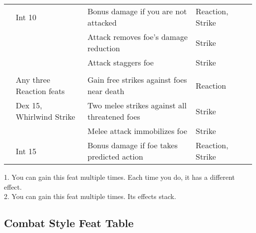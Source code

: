 \begin{longtabuwrapper}
\begin{longtabu}{>{\lcol}p{10em} >{\lcol}p{15em} >{\lcol}X >{\lcol}p{8em} >{\lcol}p{3em}}
         & Int 10 & Bonus damage if you are not attacked & Reaction, Strike &  \\
         & \x & Attack removes foe's damage reduction & Strike &  \\
         & \x & Attack staggers foe & Strike &  \\

        \midrule
         &  &  &  &  \\
         & Any three Reaction feats & Gain free strikes against foes near death & Reaction &  \\
         & Dex 15, Whirlwind Strike & Two melee strikes against all threatened foes & Strike &  \\
         & \x & Melee attack immobilizes foe & Strike &  \\
         & Int 15 & Bonus damage if foe takes predicted action & Reaction, Strike &  \\
    \end{longtabu}
    1. You can gain this feat multiple times. Each time you do, it has a different effect. \\
    2. You can gain this feat multiple times. Its effects stack. \\
\end{longtabuwrapper}

\subsection{Combat Style Feat Table}

